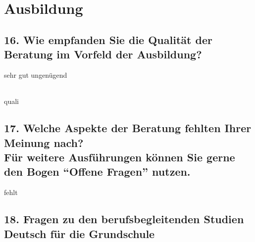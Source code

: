 \documentclass[a4paper,10pt]{article}
\begin{document}
{\vspace{-.5cm}



\section*{Ausbildung}

\subsection*{16. Wie empfanden Sie die Qualität der Beratung im Vorfeld der Ausbildung?}
\vspace{0.1cm}
\hspace{2cm} sehr gut \hspace{7.5cm} ungenügend \\ \\
\begin{questionmult}{quali}
	\begin{choiceshoriz}
		\correctchoice{}
		\correctchoice{}
		\correctchoice{}
		\correctchoice{}
		\correctchoice{}
		\correctchoice{}
	\end{choiceshoriz}
\end{questionmult}

\subsection*{17. Welche Aspekte der Beratung fehlten Ihrer Meinung nach? \\
\small Für weitere Ausführungen können Sie gerne den Bogen ``Offene Fragen'' nutzen.}
\vspace{0.5cm}
\begin{questionmult}{fehlt}
	\begin{choices}
	\end{choices}
\end{questionmult}



\subsection*{18. Fragen zu den berufsbegleitenden Studien Deutsch für die Grundschule}

}
\end{document}
